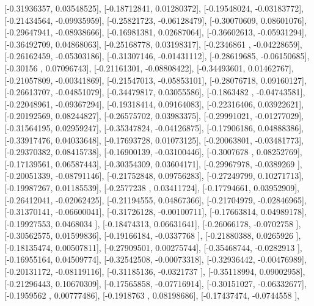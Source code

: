 \documentclass{article}
\begin{document}
       [-0.31936357,  0.03548525],
       [-0.18712841,  0.01280372],
       [-0.19548024, -0.03183772],
       [-0.21434564, -0.09935959],
       [-0.25821723, -0.06128479],
       [-0.30070609,  0.08601076],
       [-0.29647941, -0.08938666],
       [-0.16981381,  0.02687064],
       [-0.36602613, -0.05931294],
       [-0.36492709,  0.04868063],
       [-0.25168778,  0.03198317],
       [-0.2346861 , -0.04228659],
       [-0.26162459, -0.05303186],
       [-0.31307146, -0.01431112],
       [-0.28619685, -0.06150685],
       [-0.30156   ,  0.07096743],
       [-0.21161301, -0.08808422],
       [-0.34493601,  0.01462767],
       [-0.21057809, -0.00341869],
       [-0.21547013, -0.05853101],
       [-0.28076718,  0.09160127],
       [-0.26613707, -0.04851079],
       [-0.34479817,  0.03055586],
       [-0.1863482 , -0.04743581],
       [-0.22048961, -0.09367294],
       [-0.19318414,  0.09164083],
       [-0.22316406,  0.03922621],
       [-0.20192569,  0.08244827],
       [-0.26575702,  0.03983375],
       [-0.29991021, -0.01277029],
       [-0.31564195,  0.02959247],
       [-0.35347824, -0.04126875],
       [-0.17906186,  0.04888386],
       [-0.33917476,  0.04033648],
       [-0.17693728,  0.01073125],
       [-0.20063801, -0.03481773],
       [-0.29370382,  0.08415738],
       [-0.16900139, -0.03100446],
       [-0.3007678 ,  0.08252769],
       [-0.17139561,  0.06587443],
       [-0.30354309,  0.03604171],
       [-0.29967978, -0.0389269 ],
       [-0.20051339, -0.08791146],
       [-0.21752848,  0.09756283],
       [-0.27249799,  0.10271713],
       [-0.19987267,  0.01185539],
       [-0.2577238 ,  0.03411724],
       [-0.17794661,  0.03952909],
       [-0.26412041, -0.02062425],
       [-0.21194555,  0.04867366],
       [-0.21704979, -0.02846965],
       [-0.31370141, -0.06600041],
       [-0.31726128, -0.00100711],
       [-0.17663814,  0.04989178],
       [-0.19927553,  0.0468034 ],
       [-0.18474313,  0.06631641],
       [-0.26066178, -0.0702758 ],
       [-0.30562575,  0.01599836],
       [-0.19166184, -0.0337768 ],
       [-0.21880388,  0.0265926 ],
       [-0.18135474,  0.00507811],
       [-0.27909501,  0.00275744],
       [-0.35468744, -0.0282913 ],
       [-0.16955164,  0.04509774],
       [-0.32542508, -0.00073318],
       [-0.32936442, -0.00476989],
       [-0.20131172, -0.08119116],
       [-0.31185136, -0.0321737 ],
       [-0.35118994,  0.09002958],
       [-0.21296443,  0.10670309],
       [-0.17565858, -0.07716914],
       [-0.30151027, -0.06332677],
       [-0.1959562 ,  0.00777486],
       [-0.1918763 ,  0.08198686],
       [-0.17437474, -0.0744558 ],
\end{document}
